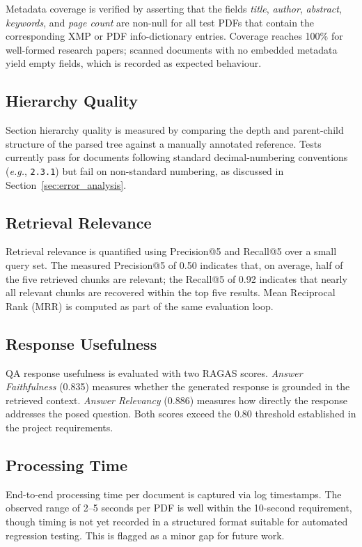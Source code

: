 \documentclass[12pt,a4paper]{report}
\begin{document}
Metadata coverage is verified by asserting that the fields \textit{title},
\textit{author}, \textit{abstract}, \textit{keywords}, and \textit{page count}
are non-null for all test PDFs that contain the corresponding XMP or PDF
info-dictionary entries. Coverage reaches 100\% for well-formed research papers;
scanned documents with no embedded metadata yield empty fields, which is recorded
as expected behaviour.

\subsection{Hierarchy Quality}

Section hierarchy quality is measured by comparing the depth and parent-child
structure of the parsed tree against a manually annotated reference. Tests
currently pass for documents following standard decimal-numbering conventions
(\textit{e.g.}, \texttt{2.3.1}) but fail on non-standard numbering, as
discussed in Section~\ref{sec:error_analysis}.

\subsection{Retrieval Relevance}

Retrieval relevance is quantified using Precision@5 and Recall@5 over a small
query set. The measured Precision@5 of 0.50 indicates that, on average, half of
the five retrieved chunks are relevant; the Recall@5 of 0.92 indicates that
nearly all relevant chunks are recovered within the top five results. Mean
Reciprocal Rank (MRR) is computed as part of the same evaluation loop.

\subsection{Response Usefulness}

QA response usefulness is evaluated with two RAGAS scores.
\textit{Answer Faithfulness} (0.835) measures whether the generated response is
grounded in the retrieved context. \textit{Answer Relevancy} (0.886) measures
how directly the response addresses the posed question. Both scores exceed the
0.80 threshold established in the project requirements.

\subsection{Processing Time}

End-to-end processing time per document is captured via log timestamps. The
observed range of 2--5 seconds per PDF is well within the 10-second requirement,
though timing is not yet recorded in a structured format suitable for automated
regression testing. This is flagged as a minor gap for future work.
\end{document}
